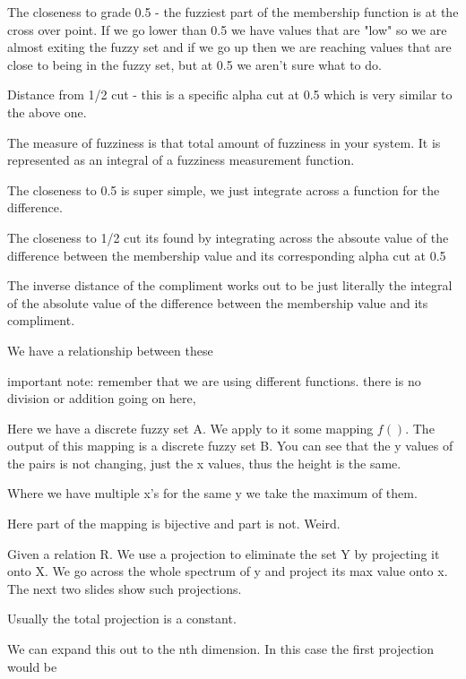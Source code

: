 \documentclass{article}
\begin{document}

The closeness to grade 0.5 - the fuzziest part of the membership function is at the cross over point. If we go lower than 0.5 we have values that are "low" so we are almost exiting the fuzzy set and if we go up then we are reaching values that are close to being in the fuzzy set, but at 0.5 we aren't sure what to do.

Distance from 1/2 cut - this is a specific alpha cut at 0.5 which is very similar to the above one.


The measure of fuzziness is that total amount of fuzziness in your system. It is represented as an integral of a fuzziness measurement function.

The closeness to 0.5 is super simple, we just integrate across a function for the difference.

The closeness to 1/2 cut its found by integrating across the absoute value of the difference between the membership value and its corresponding alpha cut at 0.5

The inverse distance of the compliment works out to be just literally the integral of the absolute value of the difference between the membership value and its compliment.

We have a relationship between these


important note: remember that we are using different functions. there is no division or addition going on here,

Here we have a discrete fuzzy set A. We apply to it some mapping $f()$. The output of this mapping is a discrete fuzzy set B. You can see that the y values of the pairs is not changing, just the x values, thus the height is the same.

Where we have multiple x's for the same y we take the maximum of them.



Here part of the mapping is bijective and part is not. Weird.


Given a relation R. We use a projection to eliminate the set Y by projecting it onto X. We go across the whole spectrum of y and project its max value onto x.  The next two slides show such projections.

Usually the total projection is a constant.

We can expand this out to the nth dimension. In this case the first projection would be
\end{document}
